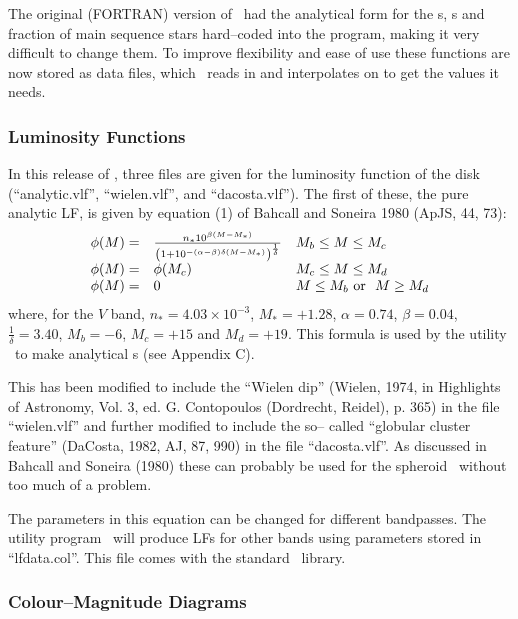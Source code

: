 \documentclass[11pt,twoside]{article}
\begin{document}
The original (FORTRAN) version of \bsm\ had the analytical form for the
\lf s, \cmd s and fraction of main sequence stars hard--coded into the
program, making it very difficult to change them. To improve flexibility
and ease of use these functions are now stored as data files, which
\bsm\ reads in and interpolates on to get the values it needs.

\subsubsection*{Luminosity Functions}

In this release of \bsm, three files are given for the luminosity function
of the disk (``analytic.vlf'', ``wielen.vlf'', and ``dacosta.vlf''). 
The first of these, the pure analytic LF, is given by equation (1) of 
Bahcall and Soneira 1980 (ApJS, 44, 73):
\[
\begin{array}{lll}
\phi(M) = & \frac{n_\ast 10^{\beta(M-M_\ast)}}
{\left( 1 + 10^{-(\alpha - \beta)\delta(M-M_\ast)}\right)^{\frac{1}{\delta}}}
& M_b \leq M \leq M_c \nonumber \\
\phi(M) = & \phi(M_c) & M_c \leq M \leq M_d  \\
\phi(M) = & 0 & M \leq M_b {\rm ~or~~} M \geq M_d
\end{array}
\]
where, for the $V$ band, $n_\ast = 4.03 \times 10^{-3}$, $M_\ast = +1.28$, 
$\alpha = 0.74$, $\beta = 0.04$, $\frac{1}{\delta} = 3.40$, $M_b = -6$, 
$M_c = +15$ and $M_d = +19$. This formula is used by the utility \mkalf\
to make analytical \lf s (see Appendix C).
 
This has been modified to include the ``Wielen dip'' (Wielen, 1974, in
Highlights of Astronomy, Vol. 3, ed. G. Contopoulos (Dordrecht, Reidel), 
p. 365) in the file ``wielen.vlf'' and further modified to include the so--
called ``globular  cluster feature''  (DaCosta, 1982, AJ, 87, 990) in  the
file ``dacosta.vlf''. As discussed in Bahcall and Soneira (1980)  these can
probably be used for the spheroid \lf\ without too much of a problem.

The parameters in this equation can be changed for different bandpasses.
The utility program \mkalf\ will produce
LFs for other bands using parameters stored in ``lfdata.col''. This file
comes with the standard \bsm\ library.

\subsubsection*{Colour--Magnitude Diagrams}
\end{document}
